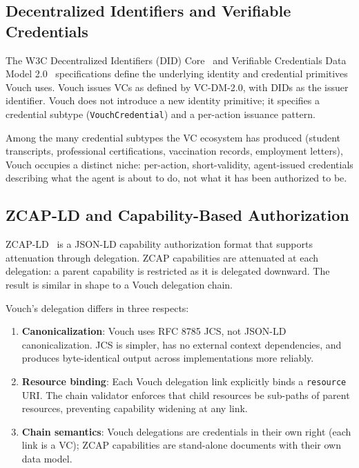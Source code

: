 \documentclass[11pt,a4paper]{article}
\begin{document}
\subsection{Decentralized Identifiers and Verifiable Credentials}

The W3C Decentralized Identifiers (DID) Core~\cite{w3cdidcore} and Verifiable Credentials Data Model 2.0~\cite{w3cvcdm2} specifications define the underlying identity and credential primitives Vouch uses. Vouch issues VCs as defined by VC-DM-2.0, with DIDs as the issuer identifier. Vouch does not introduce a new identity primitive; it specifies a credential subtype (\texttt{VouchCredential}) and a per-action issuance pattern.

Among the many credential subtypes the VC ecosystem has produced (student transcripts, professional certifications, vaccination records, employment letters), Vouch occupies a distinct niche: per-action, short-validity, agent-issued credentials describing what the agent is about to do, not what it has been authorized to be.

\subsection{ZCAP-LD and Capability-Based Authorization}

ZCAP-LD~\cite{zcapld} is a JSON-LD capability authorization format that supports attenuation through delegation. ZCAP capabilities are attenuated at each delegation: a parent capability is restricted as it is delegated downward. The result is similar in shape to a Vouch delegation chain.

Vouch's delegation differs in three respects:

\begin{enumerate}[label=\arabic*.,leftmargin=*]
\item \textbf{Canonicalization}: Vouch uses RFC 8785 JCS, not JSON-LD canonicalization. JCS is simpler, has no external context dependencies, and produces byte-identical output across implementations more reliably.
\item \textbf{Resource binding}: Each Vouch delegation link explicitly binds a \verb|resource| URI. The chain validator enforces that child resources be sub-paths of parent resources, preventing capability widening at any link.
\item \textbf{Chain semantics}: Vouch delegations are credentials in their own right (each link is a VC); ZCAP capabilities are stand-alone documents with their own data model.
\end{enumerate}
\end{document}
